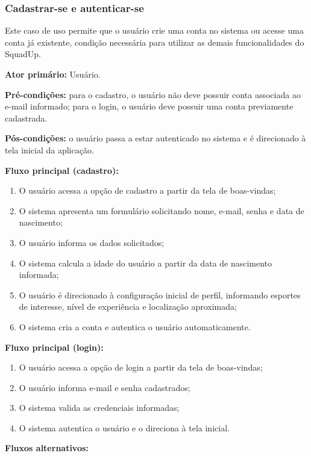 \documentclass[a4paper, 12pt]{article}
\begin{document}
\begin{justify}
\subsubsection{Cadastrar-se e autenticar-se}

Este caso de uso permite que o usuário crie uma conta no sistema ou acesse uma conta já existente, condição necessária para utilizar as demais funcionalidades do SquadUp.

\textbf{Ator primário:} Usuário.

\textbf{Pré-condições:} para o cadastro, o usuário não deve possuir conta associada ao e-mail informado; para o login, o usuário deve possuir uma conta previamente cadastrada.

\textbf{Pós-condições:} o usuário passa a estar autenticado no sistema e é direcionado à tela inicial da aplicação.

\textbf{Fluxo principal (cadastro):}

\begin{enumerate}
    \item O usuário acessa a opção de cadastro a partir da tela de boas-vindas;
    \item O sistema apresenta um formulário solicitando nome, e-mail, senha e data de nascimento;
    \item O usuário informa os dados solicitados;
    \item O sistema calcula a idade do usuário a partir da data de nascimento informada;
    \item O usuário é direcionado à configuração inicial de perfil, informando esportes de interesse, nível de experiência e localização aproximada;
    \item O sistema cria a conta e autentica o usuário automaticamente.
\end{enumerate}

\textbf{Fluxo principal (login):}

\begin{enumerate}
    \item O usuário acessa a opção de login a partir da tela de boas-vindas;
    \item O usuário informa e-mail e senha cadastrados;
    \item O sistema valida as credenciais informadas;
    \item O sistema autentica o usuário e o direciona à tela inicial.
\end{enumerate}

\textbf{Fluxos alternativos:}


\end{justify}
\end{document}
